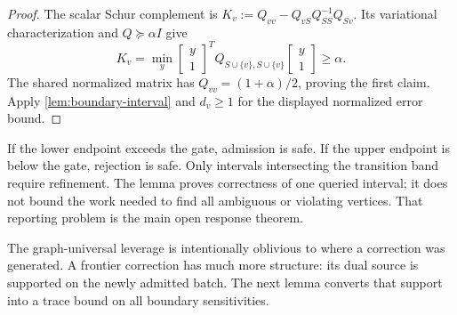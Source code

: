 \begin{proof}
The scalar Schur complement is
$K_v:=Q_{vv}-Q_{vS}Q_{SS}^{-1}Q_{Sv}$.  Its variational characterization and
$Q\succeq\alpha I$ give
\begin{equation*}
 K_v
 =\min_y\begin{bmatrix}y\\1\end{bmatrix}^{\!T}
 Q_{S\cup\{v\},S\cup\{v\}}
 \begin{bmatrix}y\\1\end{bmatrix}
 \geq\alpha.
\end{equation*}
The shared normalized matrix has $Q_{vv}=(1+\alpha)/2$, proving the first
claim.  Apply \cref{lem:boundary-interval} and $d_v\geq1$ for the displayed
normalized error bound.
\end{proof}

If the lower endpoint exceeds the gate, admission is safe.  If the upper
endpoint is below the gate, rejection is safe.  Only intervals intersecting
the transition band require refinement.  The lemma proves correctness of one
queried interval; it does not bound the work needed to find all ambiguous or
violating vertices.  That reporting problem is the main open response theorem.

The graph-universal leverage is intentionally oblivious to where a correction
was generated.  A frontier correction has much more structure: its dual
source is supported on the newly admitted batch.  The next lemma converts that
support into a trace bound on all boundary sensitivities.

